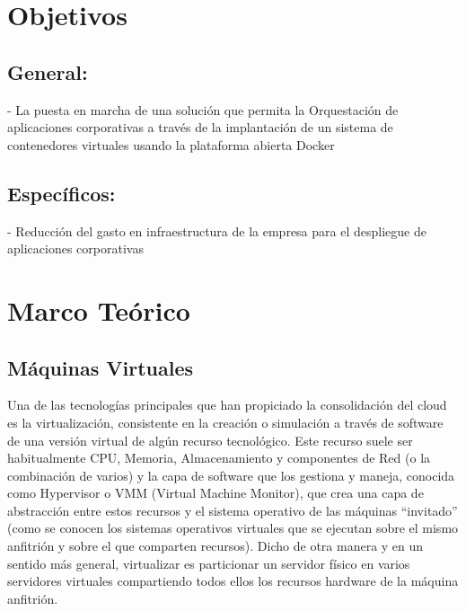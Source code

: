 \documentclass[%
 reprint,
 amsmath,amssymb,
 aps,
]{revtex4-1}
\begin{document}
\section{Objetivos}\label{sec:2}

\subsection{General:}

-  La puesta en marcha de una solución que permita la Orquestación de aplicaciones corporativas a través
de la implantación de un sistema de contenedores virtuales usando la plataforma abierta Docker 
\subsection{Específicos:}
- Reducción del gasto en infraestructura de la empresa para el despliegue de aplicaciones
corporativas

\section {Marco Teórico}\label{sec:3}


\subsection{Máquinas Virtuales}
Una de las tecnologías principales que han propiciado la consolidación del cloud es la
virtualización, consistente en la creación o simulación a través de software de una versión virtual
de algún recurso tecnológico. Este recurso suele ser habitualmente CPU, Memoria,
Almacenamiento y componentes de Red (o la combinación de varios) y la capa de software que
los gestiona y maneja, conocida como Hypervisor o VMM (Virtual Machine Monitor), que crea una
capa de abstracción entre estos recursos y el sistema operativo de las máquinas “invitado” (como
se conocen los sistemas operativos virtuales que se ejecutan sobre el mismo anfitrión y sobre el
que comparten recursos).
Dicho de otra manera y en un sentido más general, virtualizar es particionar un servidor físico en
varios servidores virtuales compartiendo todos ellos los recursos hardware de la máquina anfitrión.
\end{document}
